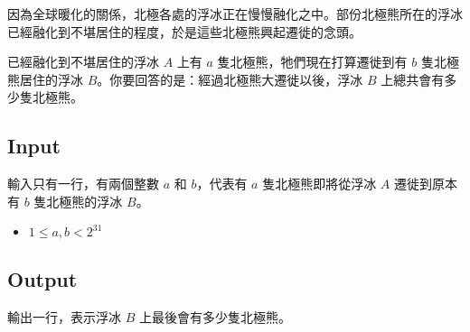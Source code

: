 
因為全球暖化的關係，北極各處的浮冰正在慢慢融化之中。部份北極熊所在的浮冰已經融化到不堪居住的程度，於是這些北極熊興起遷徙的念頭。

已經融化到不堪居住的浮冰 $A$ 上有 $a$ 隻北極熊，牠們現在打算遷徙到有 $b$ 隻北極熊居住的浮冰 $B$。你要回答的是：經過北極熊大遷徙以後，浮冰 $B$ 上總共會有多少隻北極熊。

\subsection*{Input}

輸入只有一行，有兩個整數 $a$ 和 $b$，代表有 $a$ 隻北極熊即將從浮冰 $A$ 遷徙到原本有 $b$ 隻北極熊的浮冰 $B$。

\begin{itemize}
    \item $1 \leq a, b < 2^{31}$
\end{itemize}

\subsection*{Output}

輸出一行，表示浮冰 $B$ 上最後會有多少隻北極熊。
